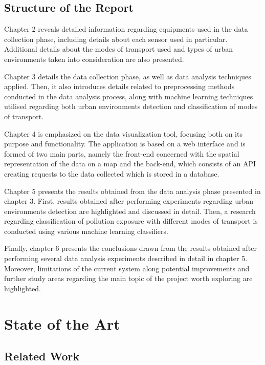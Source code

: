 \documentclass[bsc,frontabs,twoside,singlespacing, parskip,deptreport]{infthesis}     %
\begin{document}
\section{Structure of the Report}

Chapter 2 reveals detailed information regarding equipments used in the data collection phase, including details about each sensor used in particular. Additional details about the modes of transport used and types of urban environments taken into consideration are also presented.

Chapter 3 details the data collection phase, as well as data analysis techniques applied. Then, it also introduces details related to preprocessing methods conducted in the data analysis process, along with machine learning techniques utilised regarding both urban environments detection and classification of modes of transport.

Chapter 4 is emphasized on the data visualization tool, focusing both on its purpose and functionality. The application is based on a web interface and is formed of two main parts, namely the front-end concerned with the spatial representation of the data on a map and the back-end, which consists of an API creating requests to the data collected which is stored in a database.

Chapter 5 presents the results obtained from the data analysis phase presented in chapter 3. First, results obtained after performing experiments regarding urban environments detection are highlighted and discussed in detail. Then, a research regarding classification of pollution exposure with different modes of transport is conducted using various machine learning classifiers.

Finally, chapter 6 presents the conclusions drawn from the results obtained after performing several data analysis experiments described in detail in chapter 5. Moreover, limitations of the current system along potential improvements and further study areas regarding the main topic of the project worth exploring are highlighted.

\chapter{State of the Art}

\section{Related Work}
\label{sec:literature-review}
\end{document}
